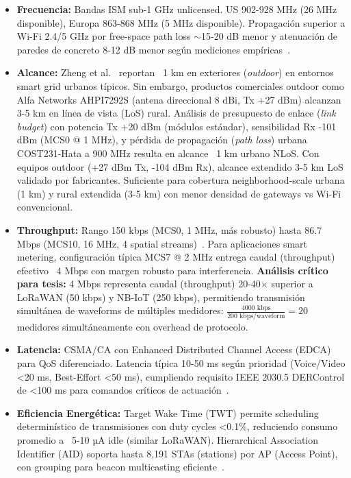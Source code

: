 \begin{itemize}
\item \textbf{Frecuencia:} Bandas ISM sub-1 GHz unlicensed. US 902-928 MHz (26 MHz disponible), Europa 863-868 MHz (5 MHz disponible). Propagación superior a Wi-Fi 2.4/5 GHz por free-space path loss $\sim$15-20 dB menor y atenuación de paredes de concreto 8-12 dB menor según mediciones empíricas~\cite{zhengPerformancePowerConsumption2018}.

\item \textbf{Alcance:} Zheng et al.~\cite{zhengPerformancePowerConsumption2018} reportan ~1 km en exteriores (\textit{outdoor}) en entornos smart grid urbanos típicos. Sin embargo, productos comerciales outdoor como Alfa Networks AHPI7292S (antena direccional 8 dBi, Tx +27 dBm) alcanzan 3-5 km en línea de vista (LoS) rural. Análisis de presupuesto de enlace (\textit{link budget}) con potencia Tx +20 dBm (módulos estándar), sensibilidad Rx -101 dBm (MCS0 @ 1 MHz), y pérdida de propagación (\textit{path loss}) urbana COST231-Hata a 900 MHz resulta en alcance ~1 km urbano NLoS. Con equipos outdoor (+27 dBm Tx, -104 dBm Rx), alcance extendido 3-5 km LoS validado por fabricantes. Suficiente para cobertura neighborhood-scale urbana (1 km) y rural extendida (3-5 km) con menor densidad de gateways vs Wi-Fi convencional.

\item \textbf{Throughput:} Rango 150 kbps (MCS0, 1 MHz, más robusto) hasta 86.7 Mbps (MCS10, 16 MHz, 4 spatial streams)~\cite{IEEE802.11ah-2016}. Para aplicaciones smart metering, configuración típica MCS7 @ 2 MHz entrega caudal (throughput) efectivo ~4 Mbps con margen robusto para interferencia. \textbf{Análisis crítico para tesis:} 4 Mbps representa caudal (throughput) 20-40$\times$ superior a LoRaWAN (50 kbps) y NB-IoT (250 kbps), permitiendo transmisión simultánea de waveforms de múltiples medidores: $\frac{4000\text{ kbps}}{200\text{ kbps/waveform}} = 20$ medidores simultáneamente con overhead de protocolo.

\item \textbf{Latencia:} CSMA/CA con Enhanced Distributed Channel Access (EDCA) para QoS diferenciado. Latencia típica 10-50 ms según prioridad (Voice/Video <20 ms, Best-Effort <50 ms), cumpliendo requisito IEEE 2030.5 DERControl de <100 ms para comandos críticos de actuación~\cite{IEEERecommendedPractice}.

\item \textbf{Eficiencia Energética:} Target Wake Time (TWT) permite scheduling determinístico de transmisiones con duty cycles <0.1\%, reduciendo consumo promedio a ~5-10 µA idle (similar LoRaWAN). Hierarchical Association Identifier (AID) soporta hasta 8,191 STAs (stations) por AP (Access Point), con grouping para beacon multicasting eficiente~\cite{IEEE802.11ah-2016}.


\end{itemize}

